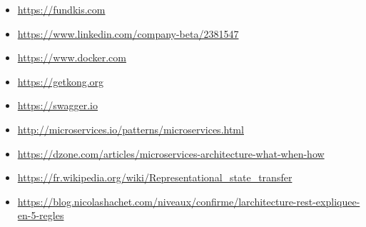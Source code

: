 \documentclass[12pt]{article}
\begin{document}
\footnotesize
\begin{itemize}
\item \url{https://fundkis.com}
\item \url{https://www.linkedin.com/company-beta/2381547}
\item \url{https://www.docker.com}
\item \url{https://getkong.org}
\item \url{https://swagger.io}
\item \url{http://microservices.io/patterns/microservices.html}
\item \url{https://dzone.com/articles/microservices-architecture-what-when-how}
\item \url{https://fr.wikipedia.org/wiki/Representational_state_transfer}
\item \url{https://blog.nicolashachet.com/niveaux/confirme/larchitecture-rest-expliquee-en-5-regles}
\end{itemize}
\label{fin}


\end{document}
